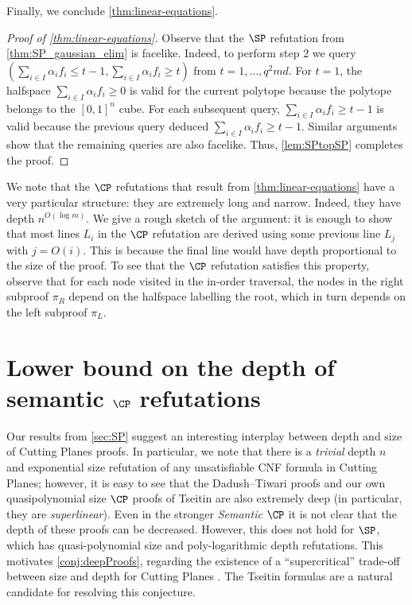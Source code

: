 	
Finally, we conclude \autoref{thm:linear-equations}.

\begin{proof}[Proof of \autoref{thm:linear-equations}]
Observe that the $\SP$ refutation from \autoref{thm:SP_gaussian_elim} is facelike. Indeed, to perform step 2 we query $(\sum_{i \in I} \alpha_i f_i \leq t-1, \sum_{i \in I} \alpha_i f_i \geq t)$ from $t = 1,\ldots, q^2md$. For $t=1$, the halfspace $\sum_{i \in I} \alpha_i f_i \geq 0$ is valid for the current polytope because the polytope belongs to the $[0,1]^n$ cube. For each subsequent query, $\sum_{i \in I} \alpha_i f_i  \geq t-1$ is valid because the previous query deduced $\sum_{i \in I} \alpha_i f_i  \geq t-1$. Similar arguments show that the remaining queries are also facelike. Thus, \autoref{lem:SPtopSP} completes the proof.
\end{proof}

We note that the $\CP$ refutations that result from  \autoref{thm:linear-equations} have a very particular structure: they are extremely long and narrow. 
Indeed, they have depth $n^{O(\log m)}$. 
We give a rough sketch of the argument: it is enough to show that most lines $L_i$ in the $\CP$ refutation are derived using some previous line $L_j$ with $j=O(i)$. %
This is because the final line would have depth proportional to the size of the proof. 
To see that the $\CP$ refutation satisfies this property, observe that for each node visited in the in-order traversal, the nodes in the right subproof $\pi_R$ depend on the halfspace labelling the root, which in turn depends on the left subproof $\pi_L$.









\section{Lower bound on the depth of semantic \texorpdfstring{$\CP$}{CP} refutations}
Our results from \autoref{sec:SP} %
suggest an interesting interplay between depth and size of Cutting Planes proofs.
In particular, we note that there is a \emph{trivial} depth $n$ and exponential size refutation of any unsatisfiable CNF formula in Cutting Planes; however, it is easy to see that the Dadush--Tiwari proofs and our own quasipolynomial size $\CP$ proofs of Tseitin are also extremely deep (in particular, they are \emph{superlinear}). Even in  the stronger \emph{Semantic} $\CP$ it is not clear that the depth of these proofs can be  decreased.
However, this does not hold for $\SP$, which has quasi-polynomial size and poly-logarithmic depth refutations.
This motivates \autoref{conj:deepProofs}, regarding the existence of a ``supercritical'' trade-off between size and depth for Cutting Planes \cite{Razborov16,BerkholzN20}. The Tseitin formulas are a natural candidate for resolving this conjecture. 

